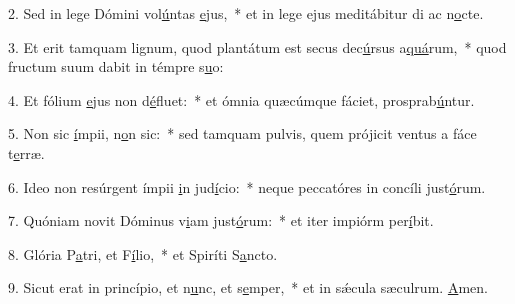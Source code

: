 2. Sed in lege Dómini vol\uline{ú}ntas \uline{e}jus,~* et in lege ejus meditábitur di ac n\uline{o}cte.\par 
3. Et erit tamquam lignum, quod plantátum est secus dec\uline{ú}rsus a\uline{quá}rum,~* quod fructum suum dabit in témpre s\uline{u}o:\par 
4. Et fólium \uline{e}jus non d\uline{é}fluet:~* et ómnia quæcúmque fáciet, prosprab\uline{ú}ntur.\par 
5. Non sic \uline{í}mpii, n\uline{o}n sic:~* sed tamquam pulvis, quem prójicit ventus a fáce t\uline{e}rræ.\par 
6. Ideo non resúrgent ímpii \uline{i}n jud\uline{í}cio:~* neque peccatóres in concíli just\uline{ó}rum.\par 
7. Quóniam novit Dóminus v\uline{i}am just\uline{ó}rum:~* et iter impiórm per\uline{í}bit.\par 
8. Glória P\uline{a}tri, et F\uline{í}lio,~* et Spiríti S\uline{a}ncto.\par 
9. Sicut erat in princípio, et n\uline{u}nc, et s\uline{e}mper,~* et in sǽcula sæculrum. \uline{A}men.\par 
